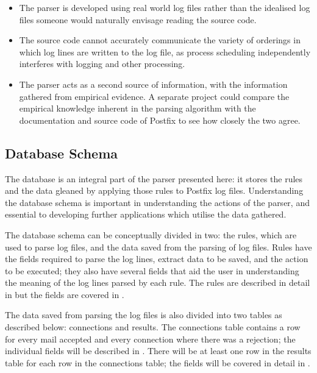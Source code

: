 \begin{itemize}

    \item The parser is developed using real world log files rather than
        the idealised log files someone would naturally envisage reading
        the source code.

    \item The source code cannot accurately communicate the variety of
        orderings in which log lines are written to the log file, as
        process scheduling independently interferes with logging and other
        processing.

    \item The parser acts as a second source of information, with the
        information gathered from empirical evidence.  A separate project
        could compare the empirical knowledge inherent in the parsing
        algorithm with the documentation and source code of Postfix to see
        how closely the two agree.

\end{itemize}



\subsection{Database Schema}
\label{database schema}

The database is an integral part of the parser presented here: it stores
the rules and the data gleaned by applying those rules to Postfix log
files.  Understanding the database schema is important in understanding the
actions of the parser, and essential to developing further applications
which utilise the data gathered.

The database schema can be conceptually divided in two: the rules, which
are used to parse log files, and the data saved from the parsing of log
files.  Rules have the fields required to parse the log lines, extract data
to be saved, and the action to be executed; they also have several fields
that aid the user in understanding the meaning of the log lines parsed by
each rule.  The rules are described in detail in  but the
fields are covered in .

The data saved from parsing the log files is also divided into two tables
as described below: connections and results.  The connections table
contains a row for every mail accepted and every connection where there was
a rejection; the individual fields will be described in
.  There will be at least one row in the
results table for each row in the connections table; the fields will be
covered in detail in .

